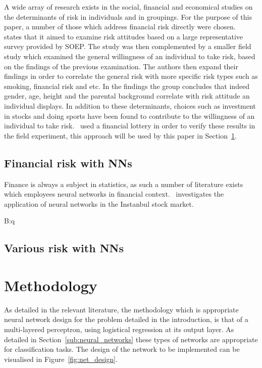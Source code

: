 \documentclass{article}
\begin{document}
A wide array of research exists in the social, financial and economical studies on the determinants of risk in individuals and in groupings. For the purpose of this paper, a number of those which address financial risk directly were chosen.~\cite{individualRiskAttitudes} states that it aimed to examine risk attitudes based on a large representative survey provided by SOEP\@. The study was then complemented by a smaller field study which examined the general willingness of an individual to take risk, based on the findings of the previous examination. The authors then expand their findings in order to correlate the general risk with more specific risk types such as smoking, financial risk and etc. In the findings the group concludes that indeed gender, age, height and the parental background correlate with risk attitude an individual displays. In addition to these determinants, choices such as investment in stocks and doing sports have been found to contribute to the willingness of an individual to take risk.~\cite{individualRiskAttitudes} used a financial lottery in order to verify these results in the field experiment, this approach will be used by this paper in Section~\ref{sec:methodology}.


\subsection{Financial risk with NNs}
\label{sub:financial_risk_nn}

Finance is always a subject in statistics, as such a number of literature exists which employees neural networks in financial context.~\cite{instanbulStock} investigates the application of neural networks in the Instanbul stock market.


B:q



\subsection{Various risk with NNs}
\label{sub:various_risk_nn}

\section{Methodology}
\label{sec:methodology}

As detailed in the relevant literature, the methodology which is appropriate neural network design for the problem detailed in the introduction, is that of a multi-layered perceptron, using logistical regression at its output layer. As detailed in Section~\ref{sub:neural_networks} these types of networks are appropriate for classification tasks. The design of the network to be implemented can be visualised in Figure~\ref{fig:net_design}. 
\end{document}
